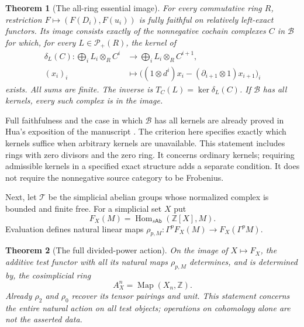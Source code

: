 \documentclass[11pt,a4paper]{article}
\newtheorem{theorem}{Theorem}[section]
\theoremstyle{definition}
\newcommand{\Hom}{\operatorname{Hom}}
\newcommand{\Z}{\mathbb Z}
\begin{document}
\begin{theorem}[The all-ring essential image]\label{thm:walking}
For every commutative ring $R$, restriction $F\mapsto(F(D_i),F(u_i))$ is fully faithful on relatively left-exact functors. Its image consists exactly of the nonnegative cochain complexes $C$ in $\mathcal B$ for which, for every $L\in\mathcal P_+(R)$, the kernel of
\begin{align*}
 \delta_L(C):\bigoplus_i L_i\otimes_R C^i&\longrightarrow\bigoplus_iL_i\otimes_R C^{i+1},\\
 (x_i)_i&\longmapsto\bigl((1\otimes d^i)x_i-(\partial_{i+1}\otimes1)x_{i+1}\bigr)_i
\end{align*}
exists. All sums are finite. The inverse is $T_C(L)=\ker\delta_L(C)$. If $\mathcal B$ has all kernels, every such complex is in the image.
\end{theorem}
Full faithfulness and the case in which $\mathcal B$ has all kernels are already proved in Hua's exposition of the manuscript \cite[pp.~165--166]{Hua}. The criterion here specifies exactly which kernels suffice when arbitrary kernels are unavailable. This statement includes rings with zero divisors and the zero ring. It concerns ordinary kernels; requiring admissible kernels in a specified exact structure adds a separate condition. It does not require the nonnegative source category to be Frobenius.

Next, let $\mathcal T$ be the simplicial abelian groups whose normalized complex is bounded and finite free. For a simplicial set $X$ put
\[
 F_X(M)=\Hom_{s\mathsf{Ab}}(\Z[X],M).
\]
Evaluation defines natural linear maps $\rho_{p,M}:\Gamma^pF_X(M)\to F_X(\Gamma^pM)$.
\begin{theorem}[The full divided-power action]\label{thm:reconstruction}
On the image of $X\mapsto F_X$, the additive test functor with all its natural maps $\rho_{p,M}$ determines, and is determined by, the cosimplicial ring
\[
 A_X^n=\operatorname{Map}(X_n,\Z).
\]
Already $\rho_2$ and $\rho_0$ recover its tensor pairings and unit. This statement concerns the entire natural action on all test objects; operations on cohomology alone are not the asserted data.
\end{theorem}
\end{document}
